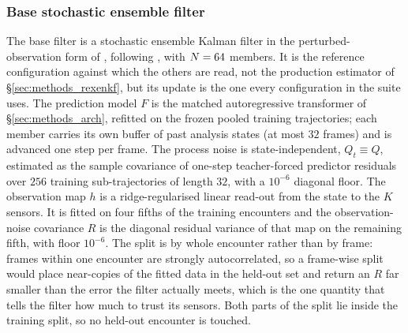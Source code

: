 \subsubsection{Base stochastic ensemble filter}
\label{sec:methods_enkf}

The base filter is a stochastic ensemble Kalman filter in the
perturbed-observation form of \citet{burgers1998}, following
\citet{evensen2003}, with $N = 64$ members. It is the reference
configuration against which the others are read, not the production estimator
of \S\ref{sec:methods_rexenkf}, but its update is the one every configuration
in the suite uses. The prediction model $F$ is the matched autoregressive
transformer of \S\ref{sec:methods_arch}, refitted on the frozen pooled training
trajectories; each member carries its own buffer of past analysis states (at
most $32$ frames) and is advanced one step per frame. The process noise is
state-independent, $Q_t \equiv Q$, estimated as the sample covariance of
one-step teacher-forced predictor residuals over $256$ training
sub-trajectories of length $32$, with a $10^{-6}$ diagonal floor. The
observation map $h$ is a ridge-regularised linear read-out from the state to
the $K$ sensors. It is fitted on four fifths of the training encounters and the
observation-noise covariance $R$ is the diagonal residual variance of that map
on the remaining fifth, with floor $10^{-6}$. The split is by whole encounter
rather than by frame: frames within one encounter are strongly autocorrelated,
so a frame-wise split would place near-copies of the fitted data in the
held-out set and return an $R$ far smaller than the error the filter actually
meets, which is the one quantity that tells the filter how much to trust its
sensors. Both parts of the split lie inside the training split, so no held-out
encounter is touched.\re

